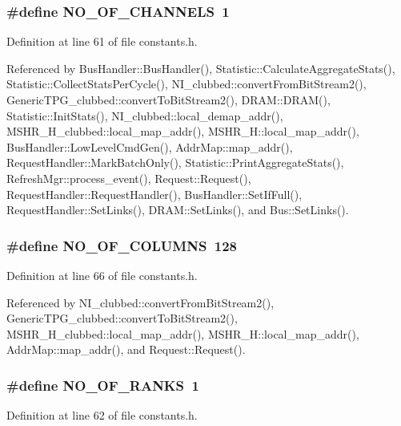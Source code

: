 \subsubsection[{NO\_\-OF\_\-CHANNELS}]{\setlength{\rightskip}{0pt plus 5cm}\#define NO\_\-OF\_\-CHANNELS~1}\label{constants_8h_c60f68d55e472737b2890684e0d41ab9}




Definition at line 61 of file constants.h.

Referenced by BusHandler::BusHandler(), Statistic::CalculateAggregateStats(), Statistic::CollectStatsPerCycle(), NI\_\-clubbed::convertFromBitStream2(), GenericTPG\_\-clubbed::convertToBitStream2(), DRAM::DRAM(), Statistic::InitStats(), NI\_\-clubbed::local\_\-demap\_\-addr(), MSHR\_\-H\_\-clubbed::local\_\-map\_\-addr(), MSHR\_\-H::local\_\-map\_\-addr(), BusHandler::LowLevelCmdGen(), AddrMap::map\_\-addr(), RequestHandler::MarkBatchOnly(), Statistic::PrintAggregateStats(), RefreshMgr::process\_\-event(), Request::Request(), RequestHandler::RequestHandler(), BusHandler::SetIfFull(), RequestHandler::SetLinks(), DRAM::SetLinks(), and Bus::SetLinks().
\subsubsection[{NO\_\-OF\_\-COLUMNS}]{\setlength{\rightskip}{0pt plus 5cm}\#define NO\_\-OF\_\-COLUMNS~128}\label{constants_8h_5b7d618f874e1731d1b531c75305fbfb}




Definition at line 66 of file constants.h.

Referenced by NI\_\-clubbed::convertFromBitStream2(), GenericTPG\_\-clubbed::convertToBitStream2(), MSHR\_\-H\_\-clubbed::local\_\-map\_\-addr(), MSHR\_\-H::local\_\-map\_\-addr(), AddrMap::map\_\-addr(), and Request::Request().
\subsubsection[{NO\_\-OF\_\-RANKS}]{\setlength{\rightskip}{0pt plus 5cm}\#define NO\_\-OF\_\-RANKS~1}\label{constants_8h_138cd8ed0a99edf6058080756390e576}




Definition at line 62 of file constants.h.

